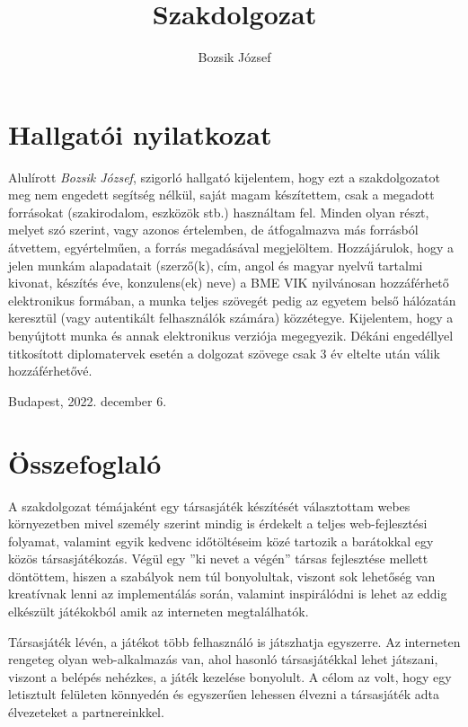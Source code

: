 \documentclass[a4paper,twoside]{article}
\title{Szakdolgozat}
\author{Bozsik József}
\begin{document}
\maketitle
\newpage
\tableofcontents
\newpage
{
\section*{Hallgatói nyilatkozat}}
Alulírott \textit{Bozsik József}, szigorló hallgató kijelentem, hogy ezt a szakdolgozatot meg
nem engedett segítség nélkül, saját magam készítettem, csak a megadott forrásokat (szakirodalom, eszközök stb.) használtam fel. Minden olyan részt, melyet szó szerint, vagy
azonos értelemben, de átfogalmazva más forrásból átvettem, egyértelműen, a forrás megadásával megjelöltem.
Hozzájárulok, hogy a jelen munkám alapadatait (szerző(k), cím, angol és magyar
nyelvű tartalmi kivonat, készítés éve, konzulens(ek) neve) a BME VIK nyilvánosan hozzáférhető elektronikus formában, a munka teljes szövegét pedig az egyetem belső hálózatán
keresztül (vagy autentikált felhasználók számára) közzétegye. Kijelentem, hogy a benyújtott munka és annak elektronikus verziója megegyezik. Dékáni engedéllyel titkosított diplomatervek esetén a dolgozat szövege csak 3 év eltelte után válik hozzáférhetővé.
\begin{flushleft}
	Budapest, 2022. december 6.
\end{flushleft}

\newpage
\section{Összefoglaló}
A szakdolgozat témájaként egy társasjáték készítését választottam webes környezetben mivel személy szerint mindig is érdekelt a teljes web-fejlesztési folyamat, valamint egyik kedvenc időtöltéseim közé tartozik a barátokkal egy közös társasjátékozás. 
Végül egy ''ki nevet a végén'' társas fejlesztése mellett döntöttem, hiszen a szabályok nem túl bonyolultak, viszont sok lehetőség van kreatívnak lenni az implementálás során, valamint inspirálódni is lehet az eddig elkészült játékokból amik az interneten megtalálhatók.

Társasjáték lévén, a játékot több felhasználó is játszhatja egyszerre.  Az interneten rengeteg olyan web-alkalmazás van, ahol hasonló társasjátékkal
lehet játszani, viszont a belépés nehézkes, a játék kezelése bonyolult. A célom az volt, hogy
egy letisztult felületen könnyedén és egyszerűen lehessen élvezni a társasjáték adta
élvezeteket a partnereinkkel.
\end{document}
